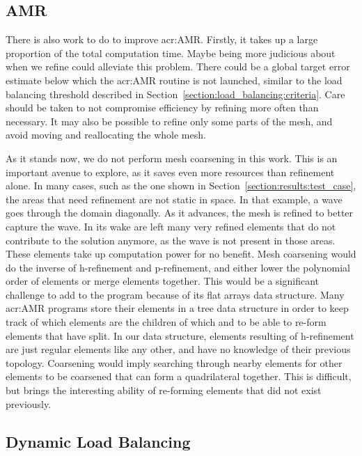 \subsection{AMR}\label{subsection:conclusion:future_work:amr}

There is also work to do to improve \acrlong{acr:AMR}. Firstly, it takes up a large proportion of
the total computation time. Maybe being more judicious about when we refine could alleviate this
problem. There could be a global target error estimate below which the \acrshort{acr:AMR} routine is
not launched, similar to the load balancing threshold described in
Section~\ref{section:load_balancing:criteria}. Care should be taken to not compromise efficiency by
refining more often than necessary. It may also be possible to refine only some parts of the mesh,
and avoid moving and reallocating the whole mesh.

As it stands now, we do not perform mesh coarsening in this work. This is an important avenue to
explore, as it saves even more resources than refinement alone. In many cases, such as the one shown
in Section~\ref{section:results:test_case}, the areas that need refinement are not static in space.
In that example, a wave goes through the domain diagonally. As it advances, the mesh is refined to
better capture the wave. In its wake are left many very refined elements that do not contribute to
the solution anymore, as the wave is not present in those areas. These elements take up computation
power for no benefit. Mesh coarsening would do the inverse of h-refinement and p-refinement, and
either lower the polynomial order of elements or merge elements together. This would be a
significant challenge to add to the program because of its flat arrays data structure. Many
\acrshort{acr:AMR} programs store their elements in a tree data structure in order to keep track of
which elements are the children of which and to be able to re-form elements that have split. In our
data structure, elements resulting of h-refinement are just regular elements like any other, and
have no knowledge of their previous topology. Coarsening would imply searching through nearby
elements for other elements to be coarsened that can form a quadrilateral together. This is
difficult, but brings the interesting ability of re-forming elements that did not exist previously.

\subsection{Dynamic Load Balancing}\label{subsection:conclusion:future_work:load_balancing}

